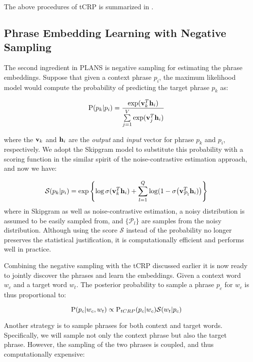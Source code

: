 The above procedures of tCRP is summarized in .

\subsection{Phrase Embedding Learning with Negative Sampling}

The second ingredient in PLANS is negative sampling for estimating the phrase
embeddings. Suppose that given a context phrase $p_i$,
the maximum likelihood model would compute the probability of predicting the
target phrase $p_k$ as:

\begin{equation}
  \P(p_k | p_i) =
    \frac{\exp(\vv_k^T \vh_i)}{\sum\limits_{j=1}^V \exp(\vv_j^T \vh_i)}
\end{equation}

where the $\vv_k$ and $\vh_i$ are the \emph{output} and \emph{input} vector for
phrase $p_k$ and $p_i$, respectively.  We adopt the Skipgram model to substitute
this probability with a scoring function in the similar spirit of the
noise-contrastive estimation approach, and now we have:

\begin{equation}
  \mathcal{S}(p_k | p_i) = \exp\left\{
  \log\sigma(\vv_k^T \vh_i) +
  \sum\limits_{l=1}^Q \log(1 - \sigma\big(\vv_{\mathcal{P}_l}^T \vh_i)\big)
  \right\}
\end{equation}
%
where in Skipgram as well as noise-contrastive estimation, a noisy distribution
is assumed to be easily sampled from, and $\{\mathcal{P}_l\}$ are samples from
the noisy distribution. Although using the score $\mathcal{S}$ instead of the
probability no longer preserves the statistical justification, it is
computationally efficient and performs well in practice.

Combining the negative sampling with the tCRP discussed earlier it is now ready
to jointly discover the phrases and learn the embeddings. Given a context word
$w_c$ and a target word $w_t$. The posterior probability to sample a phrase
$p_c$ for $w_c$ is thus proportional to:

\begin{equation}
  \P(p_c | w_c, w_t) \propto \P_{tCRP}(p_c | w_c) \mathcal{S}(w_t | p_c)
\end{equation}

Another strategy is to sample phrases for both context and target words.
Specifically, we will sample not only the context phrase but also the target
phrase. However, the sampling of the two phrases is coupled, and thus
computationally expensive:

